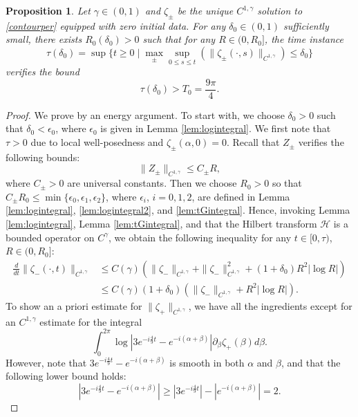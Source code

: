 \documentclass[11pt,reqno]{amsproc}
\newtheorem{prop}{Proposition}
\newcommand{\eps}{\epsilon}
\newcommand{\ze}{\zeta}
\newcommand{\p}{\partial}
\newcommand{\pb}{\p_\beta}
\newcommand{\calH}{\mathcal{H}}
\begin{document}
\begin{prop}\label{prop:pertest}
    Let $\gamma \in (0,1)$ and $\ze_\pm$ be the unique $C^{1,\gamma}$ solution to \eqref{contourper} equipped with zero initial data. For any $\delta_0 \in (0,1)$ sufficiently small, there exists $R_0(\delta_0) > 0$ such that for any $R \in (0,R_0]$, the time instance
    $$
    \tau(\delta_0) = \sup\{t \ge 0\;|\; \max_\pm \sup_{0\le s \le t}(\|\ze_\pm(\cdot,s)\|_{C^{1,\gamma}}) \le \delta_0\}
    $$
    verifies the bound
    $$
    \tau(\delta_0) > T_0 = \frac{9\pi}{4}.
    $$
\end{prop}

\begin{proof}
    We prove by an energy argument. To start with, we choose $\delta_0 > 0$ such that $\delta_0 < \eps_0$, where $\eps_0$ is given in Lemma \ref{lem:logintegral}. We first note that $\tau > 0$ due to local well-posedness and $\ze_\pm(\alpha, 0) = 0$. Recall that $Z_\pm$ verifies the following bounds:
    $$
    \|Z_\pm\|_{C^{1,\gamma}} \le C_\pm R,
    $$
    where $C_\pm > 0$ are universal constants. Then we choose $R_0 > 0$ so that $C_\pm R_0 \le \min\{\eps_0, \eps_1, \eps_2\}$, where $\eps_i$, $i = 0,1,2$, are defined in Lemma \ref{lem:logintegral}, \ref{lem:logintegral2}, and \ref{lem:tGintegral}. Hence, invoking Lemma \ref{lem:logintegral}, Lemma \ref{lem:tGintegral}, and that the Hilbert transform $\calH$ is a bounded operator on $C^\gamma$, we obtain the following inequality for any $t \in [0,\tau)$, $R \in (0,R_0]$:
    \begin{equation}
        \label{est:ze-apriori}
        \begin{aligned}
        \frac{d}{dt}\|\ze_-(\cdot,t)\|_{C^{1,\gamma}} &\le C(\gamma)\left(\|\ze_-\|_{C^{1,\gamma}} + \|\ze_-\|_{C^{1,\gamma}}^2 + (1+\delta_0)R^2|\log R|\right)\\
        &\le C(\gamma)(1+\delta_0)(\|\ze_-\|_{C^{1,\gamma}} + R^2|\log R|).
        \end{aligned}
    \end{equation}
    To show an a priori estimate for $\|\ze_+\|_{C^{1,\gamma}}$, we have all the ingredients except for an $C^{1,\gamma}$ estimate for the integral
    $$
    \int_0^{2\pi}\log\left|3e^{-i\frac49 t} - e^{-i(\alpha + \beta)}\right|\pb \ze_+(\beta) d\beta.
    $$
    However, note that $3e^{-i\frac49 t} - e^{-i(\alpha + \beta)}$ is smooth in both $\alpha$ and $\beta$, and that the following lower bound holds:
    $$
    |3e^{-i\frac49 t} - e^{-i(\alpha + \beta)}| \ge |3e^{-i\frac49 t}| - |e^{-i(\alpha + \beta)}| = 2.
$$
\end{proof}
\end{document}
